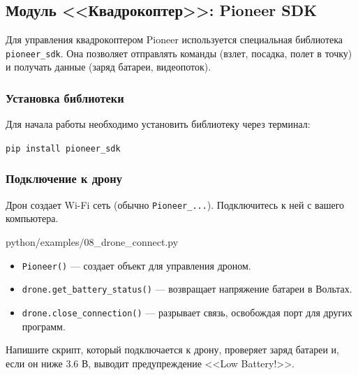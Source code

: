 \subsection{Модуль <<Квадрокоптер>>: Pioneer SDK}

Для управления квадрокоптером Pioneer используется специальная библиотека \texttt{pioneer\_sdk}. Она позволяет отправлять команды (взлет, посадка, полет в точку) и получать данные (заряд батареи, видеопоток).

\subsubsection*{Установка библиотеки}
Для начала работы необходимо установить библиотеку через терминал:

\begin{codebox}[Терминал]
\texttt{pip install pioneer\_sdk}
\end{codebox}

\subsubsection*{Подключение к дрону}
Дрон создает Wi-Fi сеть (обычно \texttt{Pioneer\_...}). Подключитесь к ней с вашего компьютера.

\begin{codefile}[python]{python/examples/08_drone_connect.py}
\end{codefile}

\begin{itemize}
    \item \texttt{Pioneer()} — создает объект для управления дроном.
    \item \texttt{drone.get\_battery\_status()} — возвращает напряжение батареи в Вольтах.
    \item \texttt{drone.close\_connection()} — разрывает связь, освобождая порт для других программ.
\end{itemize}

\begin{taskbox}[Диагностика]
Напишите скрипт, который подключается к дрону, проверяет заряд батареи и, если он ниже 3.6 В, выводит предупреждение <<Low Battery!>>.
\end{taskbox}
